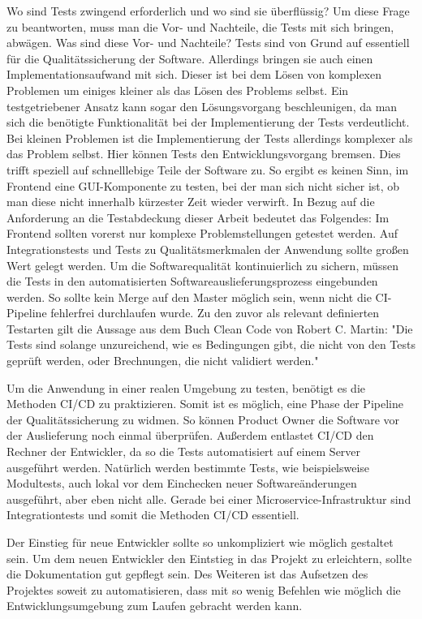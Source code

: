 Wo sind Tests zwingend erforderlich und wo sind sie überflüssig? Um diese Frage zu beantworten, muss
man die Vor- und Nachteile, die Tests mit sich bringen, abwägen. Was sind diese Vor- und Nachteile?
Tests sind von Grund auf essentiell für die Qualitätssicherung der Software. Allerdings bringen sie auch
einen Implementationsaufwand mit sich. Dieser ist bei dem Lösen von komplexen Problemen um einiges kleiner
als das Lösen des Problems selbst. Ein testgetriebener Ansatz kann sogar den Lösungsvorgang beschleunigen,
da man sich die benötigte Funktionalität bei der Implementierung der Tests verdeutlicht.
Bei kleinen Problemen ist die Implementierung der Tests allerdings komplexer als das Problem selbst.
Hier können Tests den Entwicklungsvorgang bremsen. Dies trifft speziell auf schnelllebige Teile der 
Software zu. So ergibt es keinen Sinn, im Frontend eine GUI-Komponente zu testen, bei der man sich nicht sicher ist,
ob man diese nicht innerhalb kürzester Zeit wieder verwirft. In Bezug
auf die Anforderung an die Testabdeckung dieser Arbeit bedeutet das Folgendes:
Im Frontend sollten vorerst nur komplexe Problemstellungen getestet werden. Auf Integrationstests und Tests
zu Qualitätsmerkmalen der Anwendung sollte großen Wert gelegt werden. Um die Softwarequalität kontinuierlich
zu sichern, müssen die Tests in den automatisierten Softwareauslieferungsprozess eingebunden werden. 
So sollte kein Merge auf den Master möglich sein, wenn nicht die CI-Pipeline fehlerfrei durchlaufen wurde.
Zu den zuvor als relevant definierten Testarten gilt die Aussage aus dem Buch Clean Code von Robert C. Martin:
"Die Tests sind solange unzureichend, wie es Bedingungen gibt, die nicht von den Tests geprüft werden,
oder Brechnungen, die nicht validiert werden."\cite[S. 370]{CleanCode}

Um die Anwendung in einer realen Umgebung zu testen, benötigt es die Methoden CI/CD
zu praktizieren. Somit ist es möglich, eine Phase der Pipeline der Qualitätssicherung zu widmen.
So können Product Owner die Software vor der Auslieferung noch einmal überprüfen. Außerdem
entlastet CI/CD den Rechner der Entwickler, da so die Tests automatisiert auf einem Server
ausgeführt werden. Natürlich werden bestimmte Tests, wie beispielsweise Modultests, auch 
lokal vor dem Einchecken neuer Softwareänderungen ausgeführt, aber eben nicht alle. Gerade
bei einer Microservice-Infrastruktur sind Integrationtests und somit die Methoden CI/CD essentiell.

Der Einstieg für neue Entwickler sollte so unkompliziert wie möglich gestaltet sein. Um dem neuen
Entwickler den Eintstieg in das Projekt zu erleichtern, sollte die Dokumentation gut gepflegt sein.
Des Weiteren ist das Aufsetzen des Projektes soweit zu automatisieren, dass mit so wenig Befehlen
wie möglich die Entwicklungsumgebung zum Laufen gebracht werden kann.

